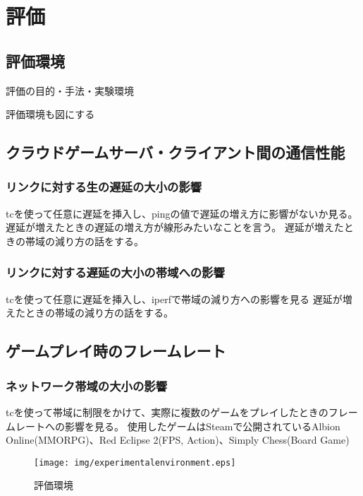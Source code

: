 \section{評価}

\subsection{評価環境}
評価の目的・手法・実験環境

評価環境も図にする

\subsection{クラウドゲームサーバ・クライアント間の通信性能}

\subsubsection{リンクに対する生の遅延の大小の影響}
tcを使って任意に遅延を挿入し、pingの値で遅延の増え方に影響がないか見る。
遅延が増えたときの遅延の増え方が線形みたいなことを言う。
遅延が増えたときの帯域の減り方の話をする。

\subsubsection{リンクに対する遅延の大小の帯域への影響}
tcを使って任意に遅延を挿入し、iperfで帯域の減り方への影響を見る
遅延が増えたときの帯域の減り方の話をする。

\subsection{ゲームプレイ時のフレームレート}

\subsubsection{ネットワーク帯域の大小の影響}
tcを使って帯域に制限をかけて、実際に複数のゲームをプレイしたときのフレームレートへの影響を見る。
使用したゲームはSteamで公開されているAlbion Online(MMORPG)、Red Eclipse 2(FPS, Action)、Simply Chess(Board Game)


\begin{figure*}[t]
    \centering
    \texttt{[image: img/experimentalenvironment.eps]}
    \caption{評価環境}
    \label{fig:expenv}
\end{figure*}

